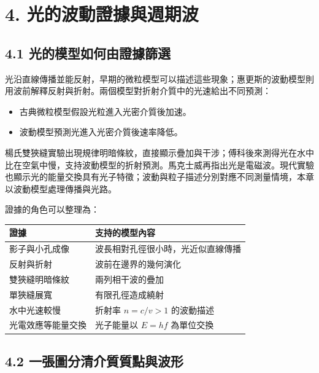 \documentclass[11pt,a4paper]{article}
\newcounter{none}
\providecommand{\tightlist}{%
  \setlength{\itemsep}{0pt}\setlength{\parskip}{0pt}}
\begin{document}
\section{4. 光的波動證據與週期波}\label{ux5149ux7684ux6ce2ux52d5ux8b49ux64daux8207ux9031ux671fux6ce2}

\subsection{4.1 光的模型如何由證據篩選}\label{ux5149ux7684ux6a21ux578bux5982ux4f55ux7531ux8b49ux64daux7be9ux9078}

光沿直線傳播並能反射，早期的微粒模型可以描述這些現象；惠更斯的波動模型則用波前解釋反射與折射。兩個模型對折射介質中的光速給出不同預測：

\begin{itemize}
\tightlist
\item
  古典微粒模型假設光粒進入光密介質後加速。
\item
  波動模型預測光進入光密介質後速率降低。
\end{itemize}

楊氏雙狹縫實驗出現規律明暗條紋，直接顯示疊加與干涉；傅科後來測得光在水中比在空氣中慢，支持波動模型的折射預測。馬克士威再指出光是電磁波。現代實驗也顯示光的能量交換具有光子特徵；波動與粒子描述分別對應不同測量情境，本章以波動模型處理傳播與光路。

證據的角色可以整理為：

{\def\LTcaptype{none} %
\begin{longtable}[]{@{}ll@{}}
\toprule\noalign{}
證據 & 支持的模型內容 \\
\midrule\noalign{}
\endhead
\bottomrule\noalign{}
\endlastfoot
影子與小孔成像 & 波長相對孔徑很小時，光近似直線傳播 \\
反射與折射 & 波前在邊界的幾何演化 \\
雙狹縫明暗條紋 & 兩列相干波的疊加 \\
單狹縫展寬 & 有限孔徑造成繞射 \\
水中光速較慢 & 折射率 \(n=c/v>1\) 的波動描述 \\
光電效應等能量交換 & 光子能量以 \(E=hf\) 為單位交換 \\
\end{longtable}
}

\subsection{4.2 一張圖分清介質質點與波形}\label{ux4e00ux5f35ux5716ux5206ux6e05ux4ecbux8ceaux8ceaux9edeux8207ux6ce2ux5f62}
\end{document}
